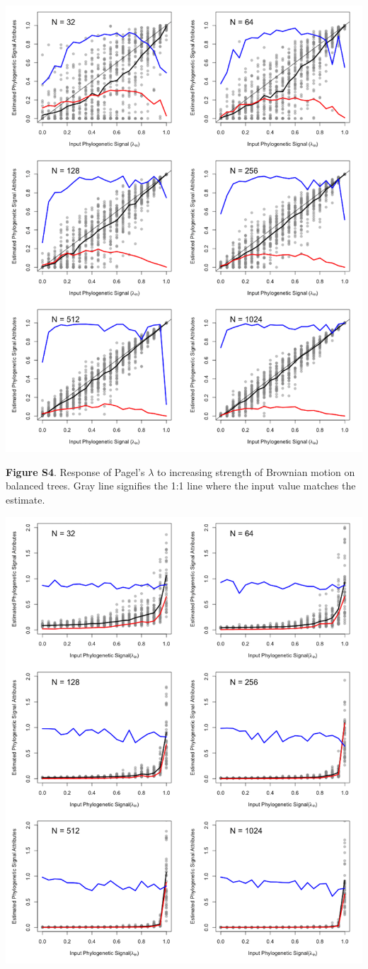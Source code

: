 \documentclass[
]{article}
\begin{document}
\includegraphics[width=0.95\linewidth]{fig.S4}

\textbf{Figure S4}. Response of Pagel's \(\lambda\) to increasing
strength of Brownian motion on balanced trees. Gray line signifies the
1:1 line where the input value matches the estimate.

\includegraphics[width=0.95\linewidth]{fig.S5}
\end{document}
